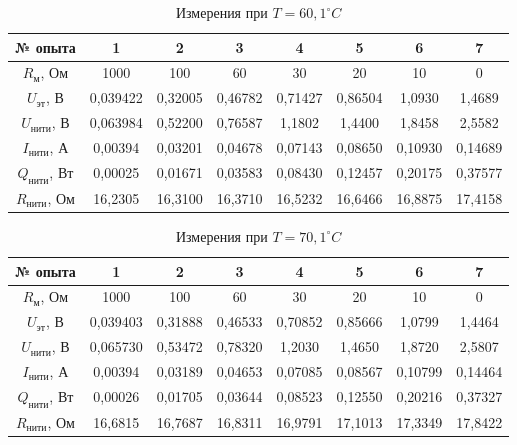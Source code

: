 \documentclass[a4paper,14pt]{article}
\begin{document}
\begin{table}[H]
\caption{Измерения при $T = 60,1^{\circ}C$}
\label{   }
\begin{tabular}{|c|c|c|c|c|c|c|c|}
\hline
№ опыта    & 1        & 2       & 3       & 4       & 5       & 6       & 7       \\ \hline
$R_{\text{м}}$, Ом    & 1000     & 100     & 60      & 30      & 20      & 10      & 0       \\ \hline
$U_{\text{эт}}$, В     & 0,039422 & 0,32005 & 0,46782 & 0,71427 & 0,86504 & 1,0930  & 1,4689  \\ \hline
$U_{\text{нити}}$, В   & 0,063984 & 0,52200 & 0,76587 & 1,1802  & 1,4400  & 1,8458  & 2,5582  \\ \hline
$I_{\text{нити}}$, А   & 0,00394  & 0,03201 & 0,04678 & 0,07143 & 0,08650 & 0,10930 & 0,14689 \\ \hline
$Q_{\text{нити}}$, Вт  & 0,00025  & 0,01671 & 0,03583 & 0,08430 & 0,12457 & 0,20175 & 0,37577 \\ \hline
$R_{\text{нити}}$, Ом & 16,2305  & 16,3100 & 16,3710 & 16,5232 & 16,6466 & 16,8875 & 17,4158 \\ \hline
\end{tabular}
\end{table}

\begin{table}[H]
\caption{Измерения при $T = 70,1^{\circ}C$}
\label{   }
\begin{tabular}{|c|c|c|c|c|c|c|c|}
\hline
№ опыта    & 1        & 2       & 3       & 4       & 5       & 6       & 7       \\ \hline
$R_{\text{м}}$, Ом    & 1000     & 100     & 60      & 30      & 20      & 10      & 0       \\ \hline
$U_{\text{эт}}$, В     & 0,039403 & 0,31888 & 0,46533 & 0,70852 & 0,85666 & 1,0799  & 1,4464  \\ \hline
$U_{\text{нити}}$, В   & 0,065730 & 0,53472 & 0,78320 & 1,2030  & 1,4650  & 1,8720  & 2,5807  \\ \hline
$I_{\text{нити}}$, А   & 0,00394  & 0,03189 & 0,04653 & 0,07085 & 0,08567 & 0,10799 & 0,14464 \\ \hline
$Q_{\text{нити}}$, Вт  & 0,00026  & 0,01705 & 0,03644 & 0,08523 & 0,12550 & 0,20216 & 0,37327 \\ \hline
$R_{\text{нити}}$, Ом & 16,6815  & 16,7687 & 16,8311 & 16,9791 & 17,1013 & 17,3349 & 17,8422 \\ \hline
\end{tabular}
\end{table}
\end{document}
